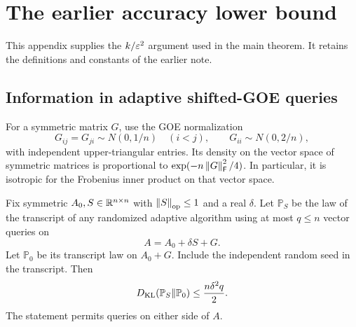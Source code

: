 \section{The earlier accuracy lower bound}\label{app:accuracy}

This appendix supplies the $k/\varepsilon^2$ argument used in the main theorem.
It retains the definitions and constants of the earlier note.

\subsection{Information in adaptive shifted-GOE queries}

For a symmetric matrix $G$, use the GOE normalization
\begin{equation}\label{eq:goe}
 G_{ij}=G_{ji}\sim N(0,1/n)\quad(i<j),\qquad
 G_{ii}\sim N(0,2/n),
\end{equation}
with independent upper-triangular entries. Its density on the vector space of
symmetric matrices is proportional to
$\exp(-n\left\lVert G\right\rVert_{\mathsf F}^2/4)$. In particular, it is isotropic for the Frobenius
inner product on that vector space.

\begin{lemma}\label{lem:kl}
Fix symmetric $A_0,S\in\mathbb R^{n\times n}$ with $\left\lVert S\right\rVert_{\mathrm{op}}\le1$ and a real
$\delta$. Let $\mathbb P_S$ be the law of the transcript of any randomized
adaptive algorithm using at most $q\le n$ vector queries on
\[
 A=A_0+\delta S+G.
\]
Let $\mathbb P_0$ be its transcript law on $A_0+G$. Include the independent
random seed in the transcript. Then
\begin{equation}\label{eq:kl}
 D_{\mathrm{KL}}(\mathbb P_S\Vert\mathbb P_0)\le\frac{n\delta^2q}{2}.
\end{equation}
The statement permits queries on either side of $A$.
\end{lemma}

